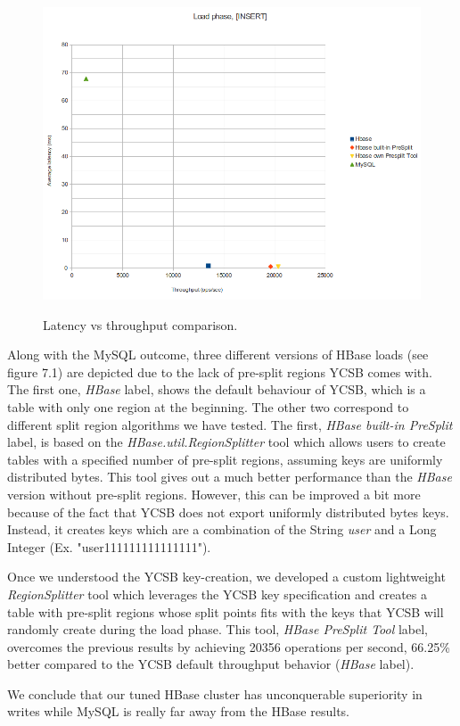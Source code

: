\begin{figure}[htb]
\centering
\includegraphics[width=1\textwidth]{./images/load.png}
 \label{fig:load}
\caption{Latency vs throughput comparison.}
\end{figure}


Along with the MySQL outcome, three different versions of HBase loads (see figure 7.1) are depicted due to the lack of pre-split regions YCSB comes with. The first one, \textit{HBase} label, shows the default behaviour of YCSB, which is a table with only one region at the beginning. The other two correspond to different split region algorithms we have tested. The first, \textit{HBase built-in PreSplit} label, is based on the \textit{HBase.util.RegionSplitter} tool which allows users to create tables with a specified number of pre-split regions, assuming keys are uniformly distributed bytes. This tool gives out a much better performance than the \textit{HBase} version without pre-split regions. However, this can be improved a bit more because of the fact that YCSB does not export uniformly distributed bytes keys. Instead, it creates keys which are a combination of the String \textit{user} and a Long Integer (Ex. "user111111111111111").
\par
Once we understood the YCSB key-creation, we developed a custom lightweight \textit{RegionSplitter} tool which leverages the YCSB key specification and creates a table with pre-split regions whose split points fits with the keys that YCSB will randomly create during the load phase. This tool, \textit{HBase PreSplit Tool} label, overcomes the previous results by achieving 20356 operations per second,  66.25\% better compared to the YCSB default throughput behavior (\textit{HBase} label). 
\par
We conclude that our tuned HBase cluster has unconquerable superiority in writes while MySQL is really far away from the HBase results.


